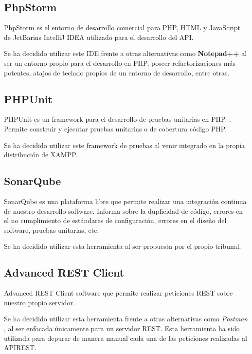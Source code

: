 \subsection{PhpStorm}

PhpStorm es el entorno de desarrollo comercial para PHP, HTML y JavaScript de JetBarins IntelliJ IDEA utilizado para el desarrollo del API. \cite{wiki:phpStorm}

Se ha decidido utilizar este IDE frente a otras alternativas como \textbf{Notepad++} \cite{wiki:notepad++} al ser un entorno propio para el desarrollo en PHP, poseer refactorizaciones más potentes, atajos de teclado propios de un entorno de desarrollo, entre otras.

\subsection{PHPUnit}

PHPUnit es un framework para el desarrollo de pruebas unitarias en PHP. \cite{wiki:phpunit}. Permite construir y ejecutar pruebas unitarias o de cobertura código PHP. 

Se ha decidido utilizar este framework de pruebas al venir integrado en la propia distribución de XAMPP.

\subsection{SonarQube}

SonarQube es una plataforma libre que permite realizar una  integración continua de nuestro desarrollo software. Informa sobre la duplicidad de código, errores en el no cumplimiento de estándares de configuración, errores en el diseño del software, pruebas unitarias, etc. \cite{wiki:sonarqube}

Se ha decidido utilizar esta herramienta al ser propuesta por el propio tribunal.

\subsection{Advanced REST Client}

Advanced REST Client software que permite realizar peticiones REST sobre nuestro propio servidor. \cite{wiki:aresrclient}

Se ha decidido utilizar esta herramienta frente a otras alternativas como \emph{Postman} \cite{wiki:postman}, al ser enfocada únicamente para un servidor REST. Esta herramienta ha sido utilizada para depurar de manera manual cada una de las peticiones realizadas al APIREST.

